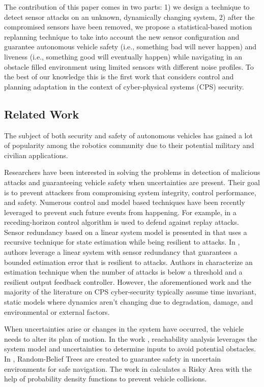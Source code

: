 The contribution of this paper comes in two parts: 1) we design a technique to detect sensor attacks on an unknown, dynamically changing system, 2) after the compromised sensors have been removed, we propose a statistical-based motion replanning technique to take into account the new sensor configuration and  guarantee autonomous vehicle safety (i.e., something bad will never happen) and liveness (i.e., something good will eventually happen) while navigating in an obstacle filled environment using limited sensors with different noise profiles. 
To the best of our knowledge this is the first work that considers control and planning adaptation in the context of cyber-physical systems (CPS) security.



\subsection{Related Work}
\label{sec:Related Work}

The subject of both security and safety of autonomous vehicles has gained a lot of popularity among the robotics community due to their potential military and civilian applications.

Researchers have been interested in solving the problems in detection of malicious attacks and guaranteeing vehicle safety when uncertainties are present. Their goal is to prevent attackers from compromising system integrity, control performance, and safety. Numerous control and model based techniques have been recently leveraged to prevent such future events from happening. For example, in \cite{zhu2012resilient} a receding-horizon control algorithm is used to defend against replay attacks. Sensor redundancy based on a linear system model is presented in \cite{6943080} that uses a recursive technique for state estimation while being resilient to attacks. In \cite{7330811}, authors leverage a linear system with sensor redundancy that guarantees a bounded estimation error that is resilient to attacks. Authors in \cite{fawzi2014secure} characterize an estimation technique when the number of attacks is below a threshold and a resilient output feedback controller. However, the aforementioned work and the majority of the literature on CPS cyber-security typically assume time invariant, static models where dynamics aren't changing due to degradation, damage, and environmental or external factors.


When uncertainties arise or changes in the system have occurred, the vehicle needs to alter its plan of motion. In the work \cite{8046382}, reachability analysis leverages the system model and uncertainties to determine inputs to avoid potential obstacles. In \cite{5980508}, Random-Belief Trees are created to guarantee safety in uncertain environments for safe navigation. The work in \cite{6934041} calculates a Risky Area with the help of probability density functions to prevent vehicle collisions. 


